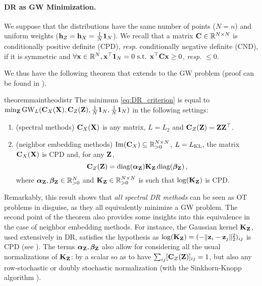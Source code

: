 \paragraph{DR as GW Minimization.} We suppose that the distributions have the same number of points ($N = n$) and uniform weights (${\mathbf{h}}_Z = {\mathbf{h}}_X = \frac{1}{N} \bm{1}_N$). We recall that a matrix ${\mathbf{C}} \in \mathbb{R}^{N \times N}$ is conditionally positive definite (CPD), \textit{resp.} conditionally negative definite (CND), if it is symmetric and $\forall {\mathbf{x}} \in \mathbb{R}^{N}, {\mathbf{x}}^\top \mathbf{1}_N = 0 \text{ s.t. } {\mathbf{x}}^\top {\mathbf{C}} {\mathbf{x}} \geq 0$, \textit{resp.} $\leq 0$. 



We thus have the following theorem that extends  to the GW problem (proof can be found in ).
\begin{restatable}{theorem}{maintheodistr}
\label{theo:main_theo}
The minimum \cref{eq:DR_criterion} is equal to $\min_{{\mathbf{Z}}}\operatorname{GW}_L({\mathbf{C}}_{X}({\mathbf{X}}), {\mathbf{C}}_{Z}({\mathbf{Z}}), \frac{1}{N}\bm{1}_N, \frac{1}{N}\bm{1}_N)$ in the following settings:
\begin{enumerate}[label=(\roman*), rightmargin=25pt]
\item (spectral methods)  ${\mathbf{C}}_{X}({\mathbf{X}})$ is any matrix, $L = L_2$ and ${\mathbf{C}}_{Z}({\mathbf{Z}}) = {\mathbf{Z}} {\mathbf{Z}}^\top$. 
\item (neighbor embedding methods) $\operatorname{Im}({\mathbf{C}}_{X}) \subseteq \mathbb{R}_{>0}^{N \times N}$, $L = L_{\operatorname{KL}}$, the matrix ${\mathbf{C}}_{X}({\mathbf{X}})$ is CPD and, for any ${\mathbf{Z}}$,
\begin{equation}
{\mathbf{C}}_{Z}({\mathbf{Z}}) = \operatorname{diag}(\boldsymbol\alpha_{\mathbf{Z}}) {\mathbf{K}}_{\mathbf{Z}} \operatorname{diag}(\boldsymbol\beta_{\mathbf{Z}})\,,
\end{equation}
where $\boldsymbol\alpha_{\mathbf{Z}}, \boldsymbol\beta_{\mathbf{Z}} \in \mathbb{R}^{N}_{> 0}$ and ${\mathbf{K}}_{\mathbf{Z}} \in \mathbb{R}^{N \times N}_{> 0}$ is such that $\log({\mathbf{K}}_{\mathbf{Z}})$ is CPD.
\end{enumerate}
\end{restatable}

Remarkably, this result shows that \emph{all spectral DR methods} can be seen as OT problems in disguise, as they all equivalently minimize a GW problem. The second point of the theorem also provides some insights into this equivalence in the case of neighbor embedding methods. For instance, the Gaussian kernel ${\mathbf{K}}_{\mathbf{Z}}$, used extensively in DR, satisfies the hypothesis as $\log({\mathbf{K}}_{\mathbf{Z}}) = (-\|{\mathbf{z}}_i-{\mathbf{z}}_j\|_2^2)_{ij}$ is CPD (see \eg \citealt{maron2018probably}). The terms $\boldsymbol\alpha_{\mathbf{Z}}, \boldsymbol\beta_{\mathbf{Z}}$ also allow for considering all the usual normalizations of ${\mathbf{K}}_{\mathbf{Z}}$: by a scalar so as to have $\sum_{ij} [{\mathbf{C}}_{Z}({\mathbf{Z}})]_{ij}=1$, but also any row-stochastic or doubly stochastic normalization (with the Sinkhorn-Knopp algorithm \citealt{sinkhorn1967concerning}).

